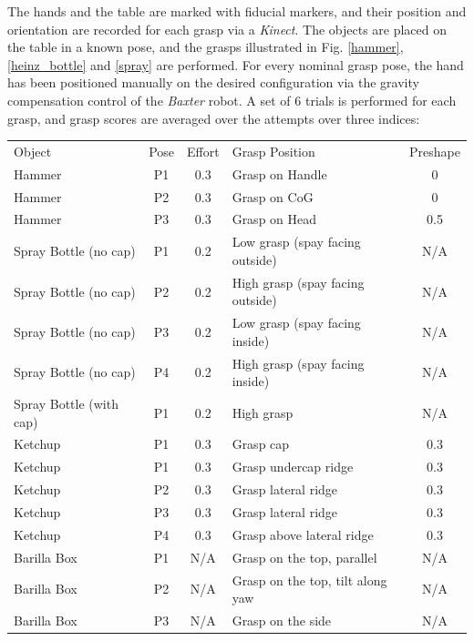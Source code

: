 The hands and the table are marked with fiducial markers, and their position and orientation are recorded for each grasp via a \emph{Kinect}. The objects are placed on the table in a known pose, and the grasps illustrated in Fig. \ref{hammer}, \ref{heinz_bottle} and \ref{spray} are performed. For every nominal grasp pose, the hand has been positioned manually on the desired configuration via the gravity compensation control of the \emph{Baxter} robot. A set of $6$ trials is performed for each grasp, and grasp scores are averaged over the attempts over three indices:

\begin{table}[hbt]
   \begin{center}
   \begin{tabular}{| p{1.5cm}  | c | c | p{2.5cm} | c |}
   \hline
   Object   & Pose  & Effort &  Grasp Position  & Preshape \\
   \cline{1-5}
   Hammer                   & P1        &   0.3 &   Grasp on Handle &   0   \\\hline
   Hammer                   & P2        &   0.3 &   Grasp on CoG    &   0   \\\hline
   Hammer                   & P3        &   0.3 &   Grasp on Head   &   0.5 \\\hline
   Spray Bottle (no cap)    & P1        &   0.2 &   Low grasp (spay facing outside)     &   N/A \\\hline
   Spray Bottle (no cap)    & P2        &   0.2 &   High grasp  (spay facing outside)   &   N/A \\\hline
   Spray Bottle (no cap)    & P3        &   0.2 &   Low grasp  (spay facing inside)     &   N/A \\\hline
   Spray Bottle (no cap)    & P4        &   0.2 &   High grasp (spay facing inside)             &   N/A \\\hline   
   Spray Bottle (with cap)  & P1        &   0.2 &   High grasp      &   N/A \\\hline
   Ketchup              & P1        &   0.3 &   Grasp cap       &   0.3 \\\hline
   Ketchup              & P1        &   0.3 &   Grasp undercap ridge    &   0.3 \\\hline
   Ketchup              & P2        &   0.3 &   Grasp lateral ridge     &   0.3 \\\hline
   Ketchup              & P3        &   0.3 &   Grasp lateral ridge     &   0.3 \\\hline
   Ketchup              & P4        &   0.3 &   Grasp above lateral ridge       &   0.3 \\\hline
   Barilla Box              & P1        &   N/A &   Grasp on the top, parallel      &   N/A \\\hline
   Barilla Box              & P2        &   N/A &   Grasp on the top, tilt along yaw    &   N/A \\\hline
   Barilla Box              & P3        &   N/A &   Grasp on the side       &   N/A \\\hline   
   

\end{tabular}
\end{center}
\end{table}
